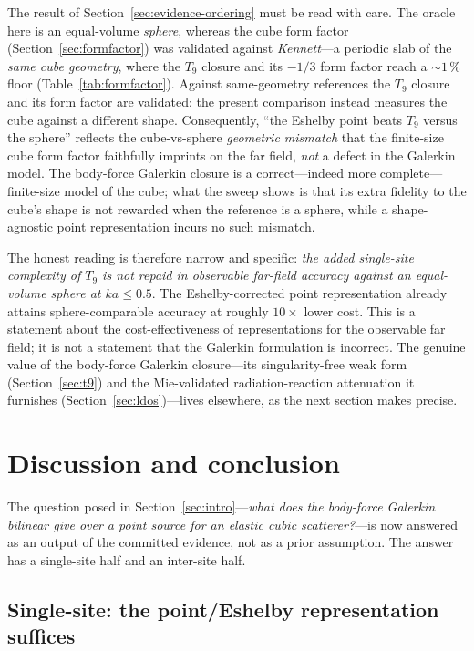 \documentclass[11pt,a4paper]{article}
\theoremstyle{plain}
\theoremstyle{definition}
\theoremstyle{remark}
\begin{document}
The result of Section~\ref{sec:evidence-ordering} must be read with care.
The oracle here is an equal-volume \emph{sphere}, whereas the cube form
factor (Section~\ref{sec:formfactor}) was validated against \emph{Kennett}---a
periodic slab of the \emph{same cube geometry}, where the $T_9$ closure and its
$-1/3$ form factor reach a ${\sim}1\,\%$ floor (Table~\ref{tab:formfactor}).
Against same-geometry references the $T_9$ closure and its form factor are
validated; the present comparison instead measures the cube against a different
shape.  Consequently, ``the Eshelby point beats $T_9$ versus the sphere''
reflects the cube-vs-sphere \emph{geometric mismatch} that the finite-size cube
form factor faithfully imprints on the far field, \emph{not} a defect in the
Galerkin model.  The body-force Galerkin closure is a correct---indeed
more complete---finite-size model of the cube; what the sweep shows is that its
extra fidelity to the cube's shape is not rewarded when the reference is a
sphere, while a shape-agnostic point representation incurs no such mismatch.

The honest reading is therefore narrow and specific: \emph{the added single-site
complexity of $T_9$ is not repaid in observable far-field accuracy against an
equal-volume sphere at $ka \le 0.5$}.  The Eshelby-corrected point
representation already attains sphere-comparable accuracy at roughly $10\times$
lower cost.  This is a statement about the cost-effectiveness of representations
for the observable far field; it is not a statement that the Galerkin formulation
is incorrect.  The genuine value of the body-force Galerkin closure---its
singularity-free weak form (Section~\ref{sec:t9}) and the Mie-validated
radiation-reaction attenuation it furnishes (Section~\ref{sec:ldos})---lives
elsewhere, as the next section makes precise.

\section{Discussion and conclusion}\label{sec:conclusion}

The question posed in Section~\ref{sec:intro}---\emph{what does the body-force
Galerkin bilinear give over a point source for an elastic cubic
scatterer?}---is now answered as an output of the committed evidence, not as a
prior assumption.  The answer has a single-site half and an inter-site half.

\subsection{Single-site: the point/Eshelby representation suffices}
\label{sec:conclusion-single}
\end{document}
